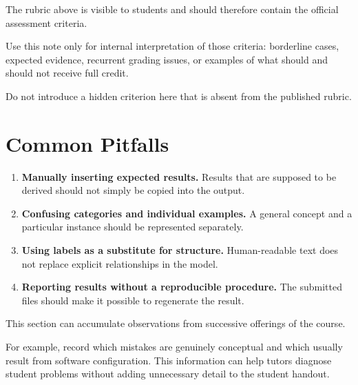 \documentclass[11pt]{article}
\begin{document}
\begin{tutornote}
The rubric above is visible to students and should therefore contain the
official assessment criteria.

Use this note only for internal interpretation of those criteria: borderline
cases, expected evidence, recurrent grading issues, or examples of what should
and should not receive full credit.

Do not introduce a hidden criterion here that is absent from the published
rubric.
\end{tutornote}

\section{Common Pitfalls}

\begin{enumerate}

    \item
    \textbf{Manually inserting expected results.}
    Results that are supposed to be derived should not simply be copied into
    the output.

    \item
    \textbf{Confusing categories and individual examples.}
    A general concept and a particular instance should be represented
    separately.

    \item
    \textbf{Using labels as a substitute for structure.}
    Human-readable text does not replace explicit relationships in the model.

    \item
    \textbf{Reporting results without a reproducible procedure.}
    The submitted files should make it possible to regenerate the result.

\end{enumerate}

\begin{tutornote}
This section can accumulate observations from successive offerings of the
course.

For example, record which mistakes are genuinely conceptual and which usually
result from software configuration. This information can help tutors diagnose
student problems without adding unnecessary detail to the student handout.
\end{tutornote}

\end{document}
